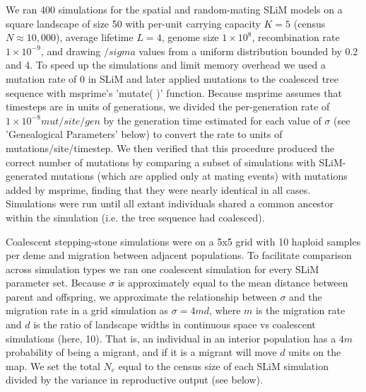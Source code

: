\documentclass[9pt,twocolumn,twoside,lineno]{gsajnl}
\begin{document}
We ran 400 simulations for the spatial and random-mating SLiM models on a square landscape of size 50 with per-unit carrying capacity $K=5$ (census $N \approx 10,000$), average lifetime $L=4$, genome size $1\times10^{8}$, recombination rate $1\times10^{-9}$, and drawing $/sigma$ values from a uniform distribution bounded by 0.2 and 4. To speed up the simulations and limit memory overhead we used a mutation rate of 0 in SLiM and later applied mutations to the coalesced tree sequence with msprime's 'mutate( )' function. Because msprime assumes that timesteps are in units of generations, we divided the per-generation rate of $1\times10^{-8} mut/site/gen$ by the generation time estimated for each value of $\sigma$ (see 'Genealogical Parameters' below) to convert the rate to units of mutations/site/timestep. We then verified that this procedure produced the correct number of mutations by comparing a subset of simulations with SLiM-generated mutations (which are applied only at mating events) with mutations added by msprime, finding that they were nearly identical in all cases. Simulations were run until all extant individuals shared a common ancestor within the simulation (i.e. the tree sequence had coalesced). 

Coalescent stepping-stone simulations were on a 5x5 grid with 10 haploid samples per deme and migration between adjacent populations. To facilitate comparison across simulation types we ran one coalescent simulation for every SLiM parameter set. Because $\sigma$ is approximately equal to the mean distance between parent and offspring, we approximate the relationship between $\sigma$ and the migration rate in a grid simulation as $\sigma=4md$, where $m$ is the migration rate and $d$ is the ratio of landscape widths in continuous space vs coalescent simulations (here, 10). That is, an individual in an interior population has a $4m$ probability of being a migrant, and if it is a migrant will move $d$ units on the map. We set the total $N_{e}$ equal to the census size of each SLiM simulation divided by the variance in reproductive output (see below). 
\end{document}
